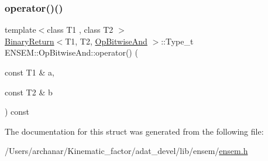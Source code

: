 \mbox{\label{structENSEM_1_1OpBitwiseAnd_aa0d3491aacf78f315c39f90394d4fa86}} 
\subsubsection{\texorpdfstring{operator()()}{operator()()}\hspace{0.1cm}{\footnotesize\ttfamily [2/2]}}
{\footnotesize\ttfamily template$<$class T1 , class T2 $>$ \\
\mbox{\hyperlink{structENSEM_1_1BinaryReturn}{Binary\+Return}}$<$T1, T2, \mbox{\hyperlink{structENSEM_1_1OpBitwiseAnd}{Op\+Bitwise\+And}} $>$\+::Type\+\_\+t E\+N\+S\+E\+M\+::\+Op\+Bitwise\+And\+::operator() (\begin{DoxyParamCaption}\item[{const T1 \&}]{a,  }\item[{const T2 \&}]{b }\end{DoxyParamCaption}) const\hspace{0.3cm}{\ttfamily [inline]}}



The documentation for this struct was generated from the following file\+:\begin{DoxyCompactItemize}
\item 
/\+Users/archanar/\+Kinematic\+\_\+factor/adat\+\_\+devel/lib/ensem/\mbox{\hyperlink{lib_2ensem_2ensem_8h}{ensem.\+h}}\end{DoxyCompactItemize}
